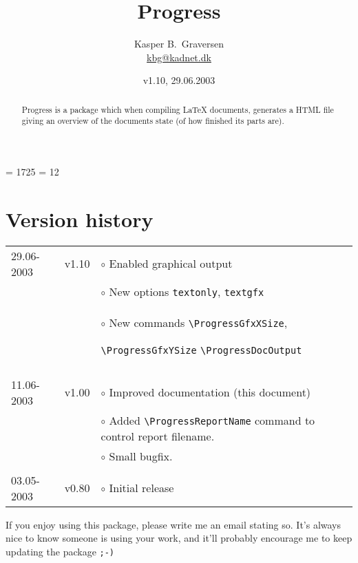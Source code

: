 \documentclass{article}
\begin{document}
\title{Progress}
\author{Kasper B.\ Graversen\\\url{kbg@kadnet.dk} }
\date{v1.10, 29.06.2003}
\maketitle

\newcommand{\margincommanda}[1]{\marginpar{{\scriptsize \texttt{\textbackslash{}#1}}}}
\newcommand{\margincommandb}[1]{\marginpar{{\scriptsize \texttt{#1}}}}


\renewcommand{\ProgressDocOutput}[1]{\vskip-0.6cm\ProgressDrawBar{#1}\vskip 0.4cm}
\ProgressGfxXSize = 1725
\ProgressGfxYSize =  12








\begin{abstract}
Progress is a package which when compiling \LaTeX{} documents,
generates a HTML file giving an overview of the documents state (of how finished its parts are).
\end{abstract}


\section{Version history}
\begin{tabular}{llp{8.4cm}}
29.06-2003  & v1.10 & $\circ$ Enabled graphical output \\
            &       & $\circ$ New options \texttt{textonly}, \texttt{textgfx}    \\
            &       & $\circ$ New commands \verb|\ProgressGfxXSize|, \par \verb|\ProgressGfxYSize| \verb|\ProgressDocOutput|    \\
\\
11.06-2003  & v1.00 & $\circ$ Improved documentation (this document)  \\
			&		& $\circ$ Added \verb|\ProgressReportName| command to control report filename.\\
			&		& $\circ$ Small bugfix.\\
\\
03.05-2003 	& v0.80 & $\circ$ Initial release \\
\end{tabular}

\bigskip
If you enjoy using this package, please write me an email stating so. It's always nice to know someone is using your work, and it'll probably encourage me to keep updating the package \verb|;-)|
\end{document}

